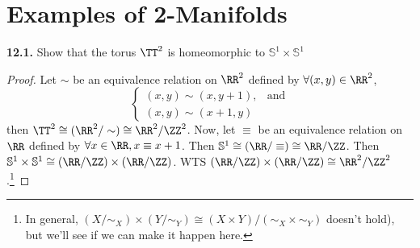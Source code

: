 \documentclass{fkbook}
\newenvironment{problem}[1][Problem \thesection.]
{\begin{boxedminipage}{\linewidth}\textbf{#1.}}
{\end{boxedminipage}}
\begin{document}
\section{Examples of 2-Manifolds}
\begin{problem}[12.1]
  Show that the torus $\TT^2$ is homeomorphic to $\mathbb{S}^1 \times
  \mathbb{S}^1$
\end{problem}
\begin{proof}
  Let $\sim$ be an equivalence relation on $\RR^2$ defined by $\forall (x,y) \in
  \RR^2$,
  \[
    \begin{cases}
      (x,y) \sim (x,y+1), & \text{and} \\
      (x,y) \sim (x+1, y)
    \end{cases}
  \]
  then $\TT^2 \cong (\RR^2 / \sim) \cong \RR^2 / \ZZ^2$. Now, let $\equiv$ be an
  equivalence relation on $\RR$ defined by $\forall x \in \RR, x \equiv x+1$.
  Then $\mathbb{S}^1 \cong (\RR / \equiv) \cong \RR/\ZZ$. Then $\mathbb{S}^1
  \times \mathbb{S}^1 \cong (\RR / \ZZ) \times (\RR / \ZZ)$. WTS $(\RR/\ZZ)
  \times (\RR / \ZZ) \cong \RR^2 / \ZZ^2$.\footnote{In general, $(X/\sim_X)
    \times (Y/\sim_Y) \cong (X \times Y)/(\sim_X \times \sim_Y)$ doesn't hold),
    but we'll see if we can make it happen here.}
\end{proof}
\end{document}
